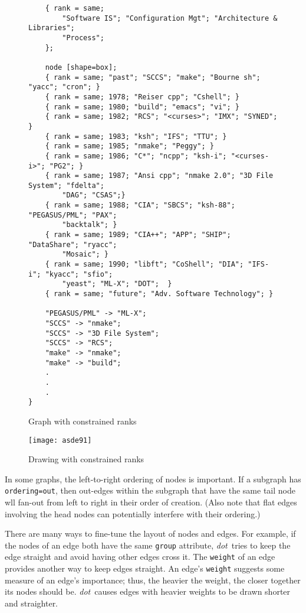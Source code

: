 \documentclass[11pt]{article}
\def\dot{{\it dot}}
\begin{document}
{\begin{figure}[p]
\begin{verbatim}
    { rank = same;
        "Software IS"; "Configuration Mgt"; "Architecture & Libraries";
        "Process";
    };

    node [shape=box];
    { rank = same; "past"; "SCCS"; "make"; "Bourne sh"; "yacc"; "cron"; }
    { rank = same; 1978; "Reiser cpp"; "Cshell"; }
    { rank = same; 1980; "build"; "emacs"; "vi"; }
    { rank = same; 1982; "RCS"; "<curses>"; "IMX"; "SYNED"; }
    { rank = same; 1983; "ksh"; "IFS"; "TTU"; }
    { rank = same; 1985; "nmake"; "Peggy"; }
    { rank = same; 1986; "C*"; "ncpp"; "ksh-i"; "<curses-i>"; "PG2"; }
    { rank = same; 1987; "Ansi cpp"; "nmake 2.0"; "3D File System"; "fdelta";
        "DAG"; "CSAS";}
    { rank = same; 1988; "CIA"; "SBCS"; "ksh-88"; "PEGASUS/PML"; "PAX";
        "backtalk"; }
    { rank = same; 1989; "CIA++"; "APP"; "SHIP"; "DataShare"; "ryacc";
        "Mosaic"; }
    { rank = same; 1990; "libft"; "CoShell"; "DIA"; "IFS-i"; "kyacc"; "sfio";
        "yeast"; "ML-X"; "DOT";  }
    { rank = same; "future"; "Adv. Software Technology"; }

    "PEGASUS/PML" -> "ML-X";
    "SCCS" -> "nmake";
    "SCCS" -> "3D File System";
    "SCCS" -> "RCS";
    "make" -> "nmake";
    "make" -> "build";
    .
    .
    .
}
\end{verbatim}
\caption{Graph with constrained ranks}
\label{fig:asde91}
\end{figure}

\begin{figure}[p]
	\centerline {
		\texttt{[image: asde91]}
	}
    \caption{Drawing with constrained ranks}
    \label{fig:asde91drawing}
\end{figure}

In some graphs, the left-to-right ordering of nodes is important.
If a subgraph has \verb"ordering=out", then out-edges within the
subgraph that have the same tail node wll fan-out from left to right
in their order of creation. (Also note that flat edges involving the
head nodes can potentially interfere with their ordering.)

There are many ways to fine-tune the layout of nodes and edges. For
example, if the nodes of an edge both have the same {\tt group}
attribute, \dot\ tries to keep the edge straight and avoid
having other edges cross it.
The {\tt weight} of an edge provides another way to keep edges
straight. An edge's {\tt weight} suggests some measure of an edge's importance;
thus, the heavier the weight, the closer together its nodes should be.
\dot\ causes edges with heavier weights to be drawn shorter and straighter.

}
\end{document}
